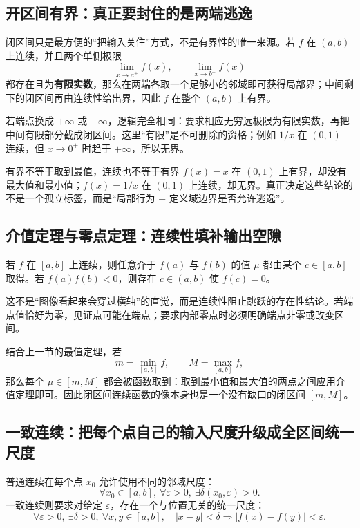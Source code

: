 \documentclass[UTF8,fontset=none,11pt,a4paper]{ctexart}
\begin{document}
\subsection{开区间有界：真正要封住的是两端逃逸}
闭区间只是最方便的“把输入关住”方式，不是有界性的唯一来源。若 $f$ 在 $(a,b)$ 上连续，并且两个单侧极限
\[
\lim_{x\to a^+}f(x),\qquad \lim_{x\to b^-}f(x)
\]
都存在且为\textbf{有限实数}，那么在两端各取一个足够小的邻域即可获得局部界；中间剩下的闭区间再由连续性给出界，因此 $f$ 在整个 $(a,b)$ 上有界。

若端点换成 $+\infty$ 或 $-\infty$，逻辑完全相同：要求相应无穷远极限为有限实数，再把中间有限部分截成闭区间。这里“有限”是不可删除的资格；例如 $1/x$ 在 $(0,1)$ 连续，但 $x\to0^+$ 时趋于 $+\infty$，所以无界。

\begin{warnbox}{有界不等于取到最值，连续也不等于有界}
$f(x)=x$ 在 $(0,1)$ 上有界，却没有最大值和最小值；$f(x)=1/x$ 在 $(0,1)$ 上连续，却无界。真正决定这些结论的不是一个孤立标签，而是“局部行为 + 定义域边界是否允许逃逸”。
\end{warnbox}

\subsection{介值定理与零点定理：连续性填补输出空隙}

若 $f$ 在 $[a,b]$ 上连续，则任意介于 $f(a)$ 与 $f(b)$ 的值 $\mu$ 都由某个 $c\in[a,b]$ 取得。若 $f(a)f(b)<0$，则存在 $c\in(a,b)$ 使 $f(c)=0$。

这不是“图像看起来会穿过横轴”的直觉，而是连续性阻止跳跃的存在性结论。若端点值恰好为零，见证点可能在端点；要求内部零点时必须明确端点非零或改变区间。

结合上一节的最值定理，若
\[
m=\min_{[a,b]}f,\qquad M=\max_{[a,b]}f,
\]
那么每个 $\mu\in[m,M]$ 都会被函数取到：取到最小值和最大值的两点之间应用介值定理即可。因此闭区间连续函数的像本身也是一个没有缺口的闭区间 $[m,M]$。

\subsection{一致连续：把每个点自己的输入尺度升级成全区间统一尺度}

普通连续在每个点 $x_0$ 允许使用不同的邻域尺度：
\[
\forall x_0\in[a,b],\ \forall\varepsilon>0,\ \exists\delta(x_0,\varepsilon)>0.
\]
一致连续则要求对给定 $\varepsilon$，存在一个与位置无关的统一尺度：
\[
\forall\varepsilon>0,\ \exists\delta>0,\ \forall x,y\in[a,b],
\quad \lvert x-y\rvert<\delta\Longrightarrow \lvert f(x)-f(y)\rvert<\varepsilon.
\]
\end{document}
